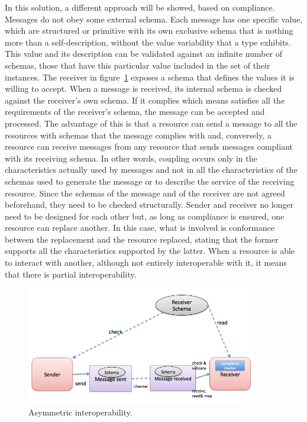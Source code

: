 \documentclass[runningheads,a4paper]{llncs}
\begin{document}
In this solution, a different approach will be showed, based on compliance. Messages do not obey some external schema. Each message has one specific value, which are structured or primitive with its own exclusive schema that is nothing more than a self-description, without the value variability that a type exhibits. This value and its description can be validated against an infinite number of schemas, those that have this particular value included in the set of their instances.
The receiver in figure~\ref{fig:Asymmetric} exposes a schema that defines the values it is willing to accept. When a message is received, its internal schema is checked against the receiver’s own schema. If it complies which means satisfies all the requirements of the receiver’s schema, the message can be accepted and processed. The advantage of this is that a resource can send a message to all the resources with schemas that the message complies with and, conversely, a resource can receive messages from any resource that sends messages compliant with its receiving schema. In other words, coupling occurs only in the characteristics actually used by messages and not in all the characteristics of the schemas used to generate the message or to describe the service of the receiving resource. Since the schemas of the message and of the receiver are not agreed beforehand, they need to be checked structurally. Sender and receiver no longer need to be designed for each other but, as long as compliance is ensured, one resource can replace another. In this case, what is involved is conformance between the replacement and the resource replaced, stating that the former supports all the characteristics supported by the latter. When a resource is able to interact with another, although not entirely interoperable with it, it means that there is partial interoperability.
\begin{figure}[!htb]
 \centering
 \includegraphics[width=0.9\textwidth]{Figures/asyc.png}
 \caption[Asymmetric interoperability.]{Asymmetric interoperability.}
 \label{fig:Asymmetric}
\end{figure}
\end{document}
